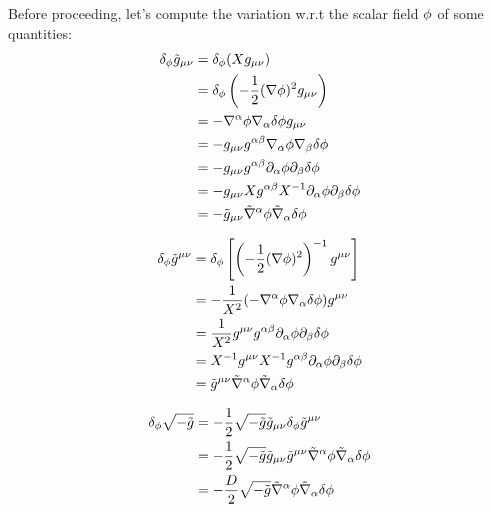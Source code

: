 Before proceeding, let's compute the variation w.r.t the scalar field $\phi$ of some quantities:
\begin{align}
  \delta_\phi \tilde{g}_{\mu\nu }&=\delta_\phi (Xg_{\mu\nu })\\
  &=\delta_\phi \left(-\frac{1}{2}(\nabla\phi )^2g_{\mu\nu }\right)\\
  &=-\nabla^\alpha \phi \nabla_\alpha \delta \phi g_{\mu\nu }\\
  &=-g_{\mu\nu }g^{\alpha\beta }\nabla_\alpha\phi\nabla_\beta\delta\phi  \\
  &=-g_{\mu\nu }g^{\alpha\beta }\partial_\alpha\phi\partial_\beta\delta\phi\\
  &=-g_{\mu\nu }Xg^{\alpha\beta }X^{-1}\partial_\alpha\phi\partial_\beta\delta\phi \\
  &=-\tilde{g}_{\mu\nu }\tilde{\nabla}^\alpha \phi\tilde{\nabla}_\alpha\delta\phi 
\end{align}

\begin{align}
  \delta_\phi \tilde{g}^{\mu\nu }&=\delta_\phi\left[\left(-\frac{1}{2}(\nabla\phi )^2\right)^{-1} g^{\mu\nu }\right]\\
  &=-\frac{1}{X^2}(-\nabla^\alpha\phi\nabla_\alpha\delta\phi )g^{\mu\nu }\\
  &=\frac{1}{X^2}g^{\mu\nu }g^{\alpha\beta }\partial_\alpha\phi\partial_\beta\delta\phi \\
  &=X^{-1}g^{\mu\nu }X^{-1}g^{\alpha\beta }\partial_\alpha\phi\partial_\beta\delta\phi \\
  &=\tilde{g}^{\mu\nu }\tilde{\nabla}^\alpha\phi\tilde{\nabla}_\alpha\delta\phi 
\end{align}

\begin{align}
  \delta_\phi \sqrt{-\tilde{g}}&=-\frac{1}{2}\sqrt{-\tilde{g}}\tilde{g}_{\mu\nu } \delta_\phi\tilde{g}^{\mu\nu }\\
  &=-\frac{1}{2}\sqrt{-\tilde{g}}\tilde{g}_{\mu\nu}\tilde{g}^{\mu\nu }\tilde{\nabla}^\alpha\phi\tilde{\nabla}_\alpha\delta\phi \\
  &=-\frac{D}{2}\sqrt{-\tilde{g}}\tilde{\nabla}^\alpha\phi \tilde{\nabla}_\alpha\delta\phi 
\end{align}










































